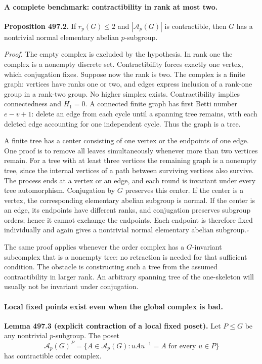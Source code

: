 \documentclass[11pt]{article}
\begin{document}
\paragraph{A complete benchmark: contractibility in rank at most two.}
\textbf{Proposition 497.2.}
If $r_p(G)\leq2$ and $|\mathcal A_p(G)|$ is contractible, then
$G$ has a nontrivial normal elementary abelian $p$-subgroup.

\emph{Proof.}
The empty complex is excluded by the hypothesis. In rank one the complex
is a nonempty discrete set. Contractibility forces exactly one vertex,
which conjugation fixes. Suppose now the rank is two. The complex is a
finite graph: vertices have ranks one or two, and edges express inclusion
of a rank-one group in a rank-two group. No higher simplex exists.
Contractibility implies connectedness and $H_1=0$. A connected finite
graph has first Betti number $e-v+1$: delete an edge from each cycle
until a spanning tree remains, with each deleted edge accounting for one
independent cycle. Thus the graph is a tree.

A finite tree has a center consisting of one vertex or the endpoints of
one edge. One proof is to remove all leaves simultaneously whenever more
than two vertices remain. For a tree with at least three vertices the
remaining graph is a nonempty tree, since the internal vertices of a path
between surviving vertices also survive. The process ends at a vertex or
an edge, and each round is invariant under every tree automorphism.
Conjugation by $G$ preserves this center. If the center is a vertex, the
corresponding elementary abelian subgroup is normal. If the center is
an edge, its endpoints have different ranks, and conjugation preserves
subgroup orders; hence it cannot exchange the endpoints. Each endpoint
is therefore fixed individually and again gives a nontrivial normal
elementary abelian subgroup.\hfill$\square$

The same proof applies whenever the order complex has a $G$-invariant
subcomplex that is a nonempty tree: no retraction is needed for that
sufficient condition. The obstacle is constructing such a tree from the
assumed contractibility in larger rank. An arbitrary spanning tree of the
one-skeleton will usually not be invariant under conjugation.

\paragraph{Local fixed points exist even when the global complex is bad.}
\textbf{Lemma 497.3 (explicit contraction of a local fixed poset).}
Let $P\leq G$ be any nontrivial $p$-subgroup. The poset
\[
 \mathcal A_p(G)^P=\{A\in\mathcal A_p(G):uAu^{-1}=A
                       \text{ for every }u\in P\}
\]
has contractible order complex.
\end{document}
